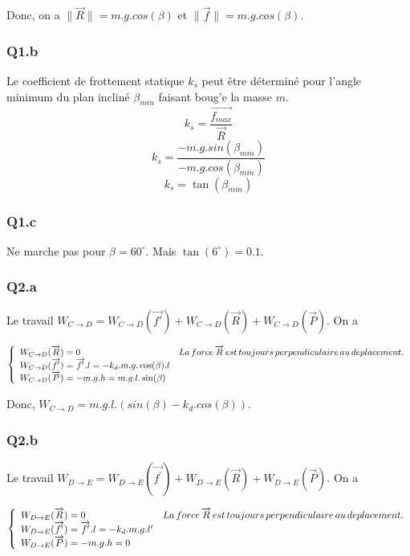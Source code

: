 \documentclass[]{book}
\theoremstyle{definition}
\begin{document}
Donc, on a $ \|\overrightarrow{R}\| = m.g.cos(\beta)$ et $\|\overrightarrow{f}\| = m.g.cos(\beta)$.

\subsubsection{Q1.b}
Le coefficient de frottement statique $k_s$ peut \^etre d\'etermin\'e pour l'angle minimum du plan inclin\'e $\beta_{min}$ faisant boug'e la masse $m$.\\
$$k_s = \frac{\overrightarrow{f_{max}}}{\overrightarrow{R}}$$
$$k_s = \frac{-m.g.sin(\beta_{min})}{-m.g.cos(\beta_{min})}$$
$$k_s = \tan(\beta_{min})$$

\subsubsection{Q1.c}
Ne marche pas pour $\beta = 60^\circ$. Mais $\tan(6^\circ) = 0.1$.

\subsubsection{Q2.a}
Le travail $W_{C \to D} = W_{C \to D}(\overrightarrow{f\prime}) + W_{C \to D}(\overrightarrow{R}) + W_{C \to D}(\overrightarrow{P})$. On a 

$$
\left\{
\begin{array}{l l}
W_{C \to D}(\overrightarrow{R}) = 0 & La\, force\, \overrightarrow{R}\, est\, toujours\, perpendiculaire\, au\, deplacement.\\
W_{C \to D}(\overrightarrow{f^\prime}) = \overrightarrow{f^\prime}.l = -k_d.m.g.\cos(\beta).l & \\
W_{C \to D}(\overrightarrow{P}) = -m.g.h = m.g.l.\sin(\beta) & \\
\end{array}
\right. 
$$

Donc, $W_{C \to D} = m.g.l.(sin(\beta) - k_d.cos(\beta))$.


\subsubsection{Q2.b}
Le travail $W_{D \to E} = W_{D \to E}(\overrightarrow{f^\prime}) + W_{D \to E}(\overrightarrow{R}) + W_{D \to E}(\overrightarrow{P})$. On a 

$$
\left\{
\begin{array}{l l}
W_{D \to E}(\overrightarrow{R}) = 0 & La\, force\, \overrightarrow{R}\, est\, toujours\, perpendiculaire\, au\, deplacement.\\
W_{D \to E}(\overrightarrow{f^\prime}) = \overrightarrow{f^\prime}.l = -k_d.m.g.l^\prime & \\
W_{D \to E}(\overrightarrow{P}) = -m.g.h = 0 & \\
\end{array}
\right. 
$$
\end{document}
